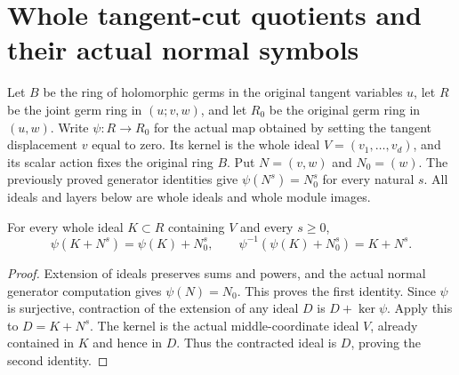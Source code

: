 \section{Whole tangent-cut quotients and their actual normal symbols}
\label{sec:hironaka-actual-tangent-cut-layers}

Let $B$ be the ring of holomorphic germs in the original tangent variables
$u$, let $R$ be the joint germ ring in $(u;v,w)$, and let $R_0$ be the
original germ ring in $(u,w)$. Write $\psi:R\to R_0$ for the actual map
obtained by setting the tangent displacement $v$ equal to zero. Its
kernel is the whole ideal $V=(v_1,\ldots,v_d)$, and its scalar action
fixes the original ring $B$. Put $N=(v,w)$ and $N_0=(w)$. The previously
proved generator identities give $\psi(N^s)=N_0^s$ for every natural $s$.
All ideals and layers below are whole ideals and whole module images.

\begin{lemma}
\label{hir:actual-tangent-cut-truncation-contraction}
\leanok
For every whole ideal $K\subset R$ containing $V$ and every $s\ge0$,
\[
 \psi(K+N^s)=\psi(K)+N_0^s,\qquad
 \psi^{-1}(\psi(K)+N_0^s)=K+N^s.
\]
\end{lemma}
\begin{proof}
Extension of ideals preserves sums and powers, and the actual normal
generator computation gives $\psi(N)=N_0$. This proves the first
identity. Since $\psi$ is surjective, contraction of the extension of
any ideal $D$ is $D+\ker\psi$. Apply this to $D=K+N^s$. The kernel is
the actual middle-coordinate ideal $V$, already contained in $K$ and
hence in $D$. Thus the contracted ideal is $D$, proving the second
identity.
\end{proof}


